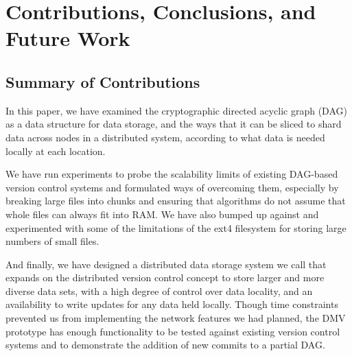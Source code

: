 \chapter{Contributions, Conclusions, and Future Work}

\section{Summary of Contributions}

In this paper, we have examined the cryptographic directed acyclic graph (DAG)
as a data structure for data storage, and the ways that it can be sliced to
shard data across nodes in a distributed system, according to what data is
needed locally at each location.

We have run experiments to probe the scalability limits of existing DAG-based
version control systems and formulated ways of overcoming them, especially by
breaking large files into chunks and ensuring that algorithms do not assume that
whole files can always fit into RAM. We have also bumped up against and
experimented with some of the limitations of the ext4 filesystem for storing
large numbers of small files.

And finally, we have designed a distributed data storage system we call
 that expands on the distributed
version control concept to store larger and more diverse data sets, with a high
degree of control over data locality, and an availability to write updates for
any data held locally. Though time constraints prevented us from implementing
the network features we had planned, the DMV prototype has enough functionality
to be tested against existing version control systems and to demonstrate the
addition of new commits to a partial DAG.
